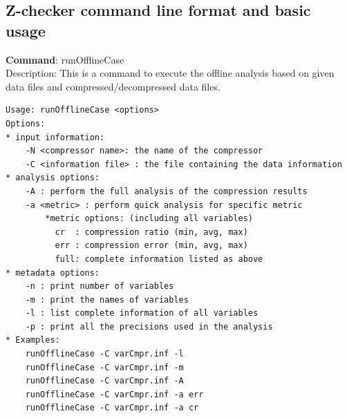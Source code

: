 \subsection{Z-checker command line format and basic usage}

\textbf{Command}: runOfflineCase\\
Description: This is a command to execute the offline analysis based on given data files and compressed/decompressed data files.
\begin{lstlisting}[style=ShellStyleInline, basicstyle = \footnotesize\ttfamily]
Usage: runOfflineCase <options>
Options:
* input information:
    -N <compressor name>: the name of the compressor
    -C <information file> : the file containing the data information
* analysis options:
    -A : perform the full analysis of the compression results
    -a <metric> : perform quick analysis for specific metric
        *metric options: (including all variables)
          cr  : compression ratio (min, avg, max)
          err : compression error (min, avg, max)
          full: complete information listed as above
* metadata options:
    -n : print number of variables
    -m : print the names of variables
    -l : list complete information of all variables
    -p : print all the precisions used in the analysis
* Examples:
    runOfflineCase -C varCmpr.inf -l
    runOfflineCase -C varCmpr.inf -m
    runOfflineCase -C varCmpr.inf -A
    runOfflineCase -C varCmpr.inf -a err
    runOfflineCase -C varCmpr.inf -a cr
\end{lstlisting}


